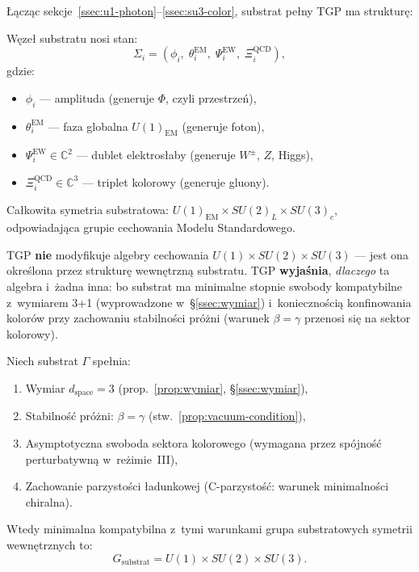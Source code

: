 Łącząc sekcje~\ref{ssec:u1-photon}--\ref{ssec:su3-color},
substrat pełny TGP ma strukturę:

\begin{definition}\label{def:full-substrate}
Węzeł substratu nosi stan:
\begin{equation}\label{eq:full-substrate-state}
    \Sigma_i = (\phi_i,\;\theta_i^{\mathrm{EM}},\;\Psi_i^{\mathrm{EW}},
                \;\Xi_i^{\mathrm{QCD}}),
\end{equation}
gdzie:
\begin{itemize}[nosep]
    \item $\phi_i$ --- amplituda (generuje $\Phi$, czyli przestrze\'n),
    \item $\theta_i^{\mathrm{EM}}$ --- faza globalna $U(1)_{\mathrm{EM}}$
          (generuje foton),
    \item $\Psi_i^{\mathrm{EW}} \in \mathbb{C}^2$ --- dublet
          elektrosłaby (generuje $W^\pm$, $Z$, Higgs),
    \item $\Xi_i^{\mathrm{QCD}} \in \mathbb{C}^3$ --- triplet
          kolorowy (generuje gluony).
\end{itemize}
Całkowita symetria substratowa: $U(1)_{\mathrm{EM}} \times SU(2)_L
\times SU(3)_c$, odpowiadająca grupie cechowania Modelu Standardowego.
\end{definition}

\begin{remark}
TGP \textbf{nie} modyfikuje algebry cechowania $U(1) \times SU(2)
\times SU(3)$ --- jest ona określona przez strukturę wewnętrzną
substratu. TGP \textbf{wyjaśnia}, \emph{dlaczego} ta algebra
i~żadna inna: bo substrat ma minimalne stopnie swobody kompatybilne
z~wymiarem 3+1 (wyprowadzone w~\S\ref{ssec:wymiar})
i~koniecznością konfinowania kolorów przy zachowaniu stabilności
próżni (warunek $\beta = \gamma$ przenosi się na sektor kolorowy).
\end{remark}

\begin{theorem}%
\label{thm:gauge-uniqueness}
Niech substrat $\Gamma$ spełnia:
\begin{enumerate}[nosep]
    \item[(G1)] Wymiar $d_{\mathrm{space}} = 3$
          (prop.~\ref{prop:wymiar}, \S\ref{ssec:wymiar}),
    \item[(G2)] Stabilność próżni: $\beta = \gamma$ (stw.~\ref{prop:vacuum-condition}),
    \item[(G3)] Asymptotyczna swoboda sektora kolorowego
          (wymagana przez spójność perturbatywną w~reżimie~III),
    \item[(G4)] Zachowanie parzystości ładunkowej
          (C-parzystość: warunek minimalności chiralna).
\end{enumerate}
Wtedy minimalna kompatybilna z~tymi warunkami grupa substratowych
symetrii wewnętrznych to:
\begin{equation}\label{eq:gauge-group-unique}
    \boxed{
        G_{\mathrm{substrat}} = U(1) \times SU(2) \times SU(3).
    }
\end{equation}
\end{theorem}

